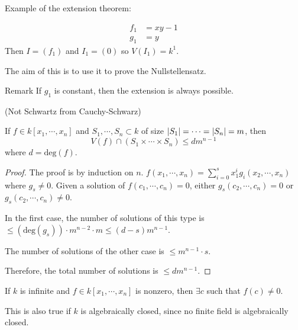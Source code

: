 \documentclass[a4paper,twoside,master.tex]{subfiles}
\begin{document}

Example of the extension theorem:
\begin{ex}
    \begin{align}
        f_1 &= xy-1\\
        g_1 &= y
    \end{align}
    Then $ I = (f_1) $ and $ I_1 = (0) $ so $ V(I_1) = k^1 $.
\end{ex}

The aim of this is to use it to prove the Nullstellensatz.

\begin{note}{Remark}
    If $ g_1 $ is constant, then the extension is always possible.
\end{note}

\begin{lemma}
    (Not Schwartz from Cauchy-Schwarz)

    If $ f \in k[x_1, \cdots, x_n] $ and $ S_1, \cdots, S_n \subset k $ of size $ \abs{S_1} = \cdots = \abs{S_n} = m $, then
    \begin{equation}
        V(f) \cap (S_1 \times \cdots \times S_n) \leq d m^{n - 1}
    \end{equation}
    where $ d = \text{deg}(f) $.
\end{lemma}
\begin{proof}
    The proof is by induction on $ n $. $ f(x_1, \cdots, x_n) = \sum_{i=0}^{s} x_1^i g_i(x_2, \cdots, x_n) $ where $ g_s \neq 0 $. Given a solution of $ f(c_1, \cdots, c_n) = 0 $, either $ g_s(c_2, \cdots, c_n) = 0 $ or $ g_s(c_2, \cdots, c_n) \neq 0 $.

    In the first case, the number of solutions of this type is $ \leq (\text{deg}(g_s)) \cdot m^{n-2} \cdot m \leq (d-s)m^{n-1} $.

    The number of solutions of the other case is $ \leq m^{n-1} \cdot s $.

    Therefore, the total number of solutions is $ \leq dm^{n-1} $.
\end{proof}

\begin{corollary}
    If $ k $ is infinite and $ f \in k[x_1, \cdots, x_n] $ is nonzero, then $ \exists c $ such that $ f(c) \neq 0 $.
\end{corollary}
\begin{corollary}
    This is also true if $ k $ is algebraically closed, since no finite field is algebraically closed.
\end{corollary}
\end{document}
